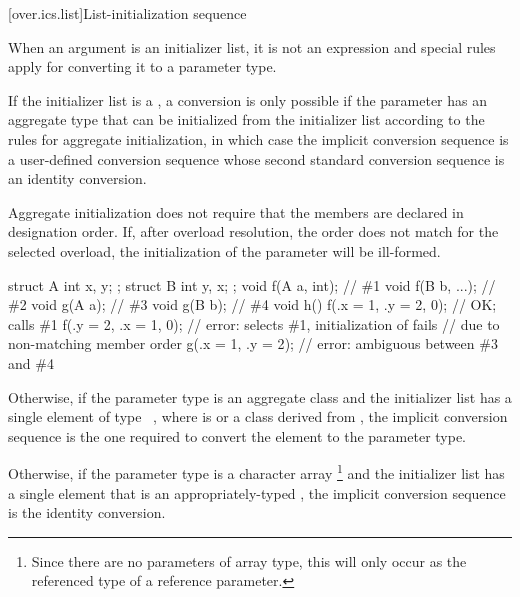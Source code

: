 [over.ics.list]{List-initialization sequence}

\pnum
When an argument is an initializer list, it is not an %
expression and special rules apply for converting it to a parameter type.

\pnum
If the initializer list is a ,
a conversion is only possible if
the parameter has an aggregate type
that can be initialized from the initializer list
according to the rules for aggregate initialization,
in which case the implicit conversion sequence is
a user-defined conversion sequence
whose second standard conversion sequence
is an identity conversion.
\begin{note}
Aggregate initialization does not require that
the members are declared in designation order.
If, after overload resolution, the order does not match
for the selected overload,
the initialization of the parameter will be ill-formed.
\begin{example}
\begin{codeblock}
struct A { int x, y; };
struct B { int y, x; };
void f(A a, int);               // \#1
void f(B b, ...);               // \#2
void g(A a);                    // \#3
void g(B b);                    // \#4
void h() {
  f({.x = 1, .y = 2}, 0);       // OK; calls \#1
  f({.y = 2, .x = 1}, 0);       // error: selects \#1, initialization of  fails
                                // due to non-matching member order
  g({.x = 1, .y = 2});          // error: ambiguous between \#3 and \#4
}
\end{codeblock}
\end{example}
\end{note}

\pnum
Otherwise,
if the parameter type is an aggregate class  and the initializer list has a
single element of type \cv{}~, where  is 
or a class derived from , the implicit conversion sequence is the one
required to convert the element to the parameter type.

\pnum
Otherwise, if the parameter type is a character array%
\footnote{Since there are no parameters of array type,
this will only occur as the referenced type of a reference parameter.}
and the initializer list has a single element that is an appropriately-typed
, the implicit conversion
sequence is the identity conversion.

